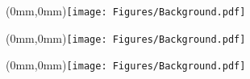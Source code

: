 \documentclass[url,11pt]{book}
\begin{document}
\clearpage
\FloatBarrier
\begin{textblock*}{297mm}(0mm,0mm)\texttt{[image: Figures/Background.pdf]}
\end{textblock*}

\clearpage
\FloatBarrier
\begin{textblock*}{297mm}(0mm,0mm)\texttt{[image: Figures/Background.pdf]}
\end{textblock*}

\clearpage
\FloatBarrier
\begin{textblock*}{297mm}(0mm,0mm)\texttt{[image: Figures/Background.pdf]}
\end{textblock*}

\clearpage



\clearpage
{}
\appendix




\clearpage
{}


\end{document}
